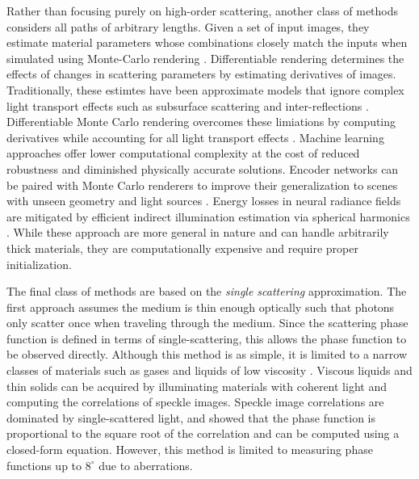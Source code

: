 Rather than focusing purely on high-order scattering, another class of methods considers all paths of arbitrary lengths. Given a set of input images, they estimate material parameters whose combinations closely match the inputs when simulated using Monte-Carlo rendering \cite{dutre2018advanced, novak2018monte}. Differentiable rendering determines the effects of changes in scattering parameters by estimating derivatives of images. Traditionally, these estimtes have been approximate models that ignore complex light transport effects such as subsurface scattering and inter-reflections \cite{loper2014opendr}. Differentiable Monte Carlo rendering overcomes these limiations by computing derivatives while accounting for all light transport effects \cite{gkioulekas2016evaluation, gkioulekas2013inverse, khungurn2015matching, nimier2020radiative, nimier2019mitsuba}. Machine learning approaches offer lower computational complexity at the cost of reduced robustness and diminished physically accurate solutions. Encoder networks can be paired with Monte Carlo renderers to improve their generalization to scenes with unseen geometry and light sources \cite{wu2017neural, che2020towards}. Energy losses in neural radiance fields are mitigated by efficient indirect illumination estimation via spherical harmonics \cite{zheng2021neural}. While these approach are more general in nature and can handle arbitrarily thick materials, they are computationally expensive and require proper initialization.

The final class of methods are based on the \textit{single scattering} approximation. The first approach assumes the medium is thin enough optically such that photons only scatter once when traveling through the medium. Since the scattering phase function is defined in terms of single-scattering, this allows the phase function to be observed directly. Although this method is as simple, it is limited to a narrow classes of materials such as gases and liquids of low viscosity \cite{narasimhan2006acquiring}. Viscous liquids and thin solids can be acquired by illuminating materials with coherent light and computing the correlations of speckle images. Speckle image correlations are dominated by single-scattered light, and \cite{alterman2022direct} showed that the phase function is proportional to the square root of the correlation and can be computed using a closed-form equation. However, this method is limited to measuring phase functions up to $8^\circ$ due to aberrations.

